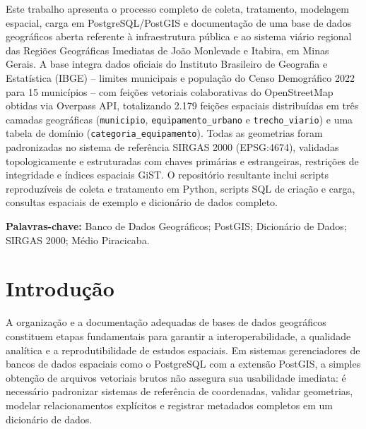 \documentclass[
    12pt,
    oneside,
    a4paper,
    chapter=TITLE,
    section=TITLE,
    brazil
]{abntex2}
\begin{document}
\imprimircapa
\imprimirfolhaderosto*

\begin{resumo}
Este trabalho apresenta o processo completo de coleta, tratamento, modelagem espacial, carga em PostgreSQL/PostGIS e documentação de uma base de dados geográficos aberta referente à infraestrutura pública e ao sistema viário regional das Regiões Geográficas Imediatas de João Monlevade e Itabira, em Minas Gerais. A base integra dados oficiais do Instituto Brasileiro de Geografia e Estatística (IBGE) -- limites municipais e população do Censo Demográfico 2022 para 15 municípios -- com feições vetoriais colaborativas do OpenStreetMap obtidas via Overpass API, totalizando 2.179 feições espaciais distribuídas em três camadas geográficas (\texttt{municipio}, \texttt{equipamento\_urbano} e \texttt{trecho\_viario}) e uma tabela de domínio (\texttt{categoria\_equipamento}). Todas as geometrias foram padronizadas no sistema de referência SIRGAS 2000 (EPSG:4674), validadas topologicamente e estruturadas com chaves primárias e estrangeiras, restrições de integridade e índices espaciais GiST. O repositório resultante inclui scripts reproduzíveis de coleta e tratamento em Python, scripts SQL de criação e carga, consultas espaciais de exemplo e dicionário de dados completo.

\vspace{0.4cm}
\noindent\textbf{Palavras-chave:} Banco de Dados Geográficos; PostGIS; Dicionário de Dados; SIRGAS 2000; Médio Piracicaba.
\end{resumo}

\listoffigures*
\cleardoublepage

\listoftables*
\cleardoublepage

\tableofcontents*
\cleardoublepage

\textual

\chapter{Introdução}

A organização e a documentação adequadas de bases de dados geográficos constituem etapas fundamentais para garantir a interoperabilidade, a qualidade analítica e a reprodutibilidade de estudos espaciais. Em sistemas gerenciadores de bancos de dados espaciais como o PostgreSQL com a extensão PostGIS, a simples obtenção de arquivos vetoriais brutos não assegura sua usabilidade imediata: é necessário padronizar sistemas de referência de coordenadas, validar geometrias, modelar relacionamentos explícitos e registrar metadados completos em um dicionário de dados.
\end{document}
